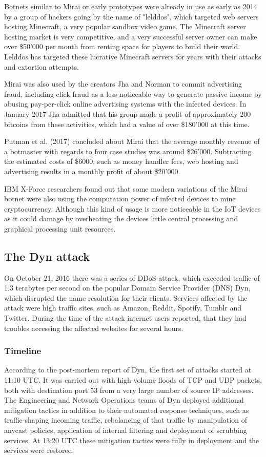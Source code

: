 Botnets similar to Mirai or early prototypes were already in use as early as 2014 by a group of hackers going by the name of "lelddos", which targeted web servers hosting Minecraft, a very popular sandbox video game. The Minecraft server hosting market is very competitive, and a very successful server owner can make over \$50'000 per month from renting space for players to build their world. Lelddos has targeted these lucrative Minecraft servers for years with their attacks and extortion attempts. \cite{Krebs17}

Mirai was also used by the creators Jha and Norman to commit advertising fraud, including click fraud as a less noticeable way to generate passive income by abusing pay-per-click online advertising systems with the infected devices. In January 2017 Jha admitted that his group made a profit of approximately 200 bitcoins from these activities, which had a value of over \$180'000 at this time. \cite{Krebs17_2}

Putman et al. (2017) concluded about Mirai that the average monthly revenue of a botmaster with regards to four case studies was around \$26'000. Subtracting the estimated costs of \$6000, such as money handler fees, web hosting and advertising results in a monthly profit of about \$20'000. \cite{Putman}

IBM X-Force researchers found out that some modern variations of the Mirai botnet were also using the computation power of infected devices to mine cryptocurrency. Although this kind of usage is more noticeable in the IoT devices as it could damage by overheating the devices little central processing and graphical processing unit resources. \cite{DeBeck19}

	\subsection{The Dyn attack}
	On October 21, 2016 there was a series of DDoS attack, which exceeded traffic of 1.3 terabytes per second on the popular Domain Service Provider (DNS) Dyn, which disrupted the name resolution for their clients. Services affected by the attack were high traffic sites, such as Amazon, Reddit, Spotify, Tumblr and Twitter. During the time of the attack internet users reported, that they had troubles accessing the affected websites for several hours.\cite{Moss16}
		
		\subsubsection{Timeline}
		According to the post-mortem report of Dyn, the first set of attacks started at 11:10 UTC. It was carried out with high-volume floods of TCP and UDP packets, both with destination port 53 from a very large number of source IP addresses. The Engineering and Network Operations teams of Dyn deployed additional mitigation tactics in addition to their automated response techniques, such as traffic-shaping incoming traffic, rebalancing of that traffic by manipulation of anycast policies, application of internal filtering and deployment of scrubbing services. At 13:20 UTC these mitigation tactics were fully in deployment and the services were restored. \cite{Dyn16}
		

